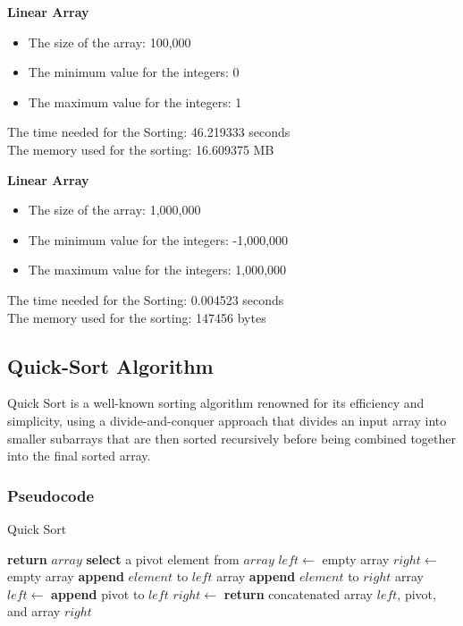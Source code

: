 \documentclass{article}
\begin{document}
\textbf{Linear Array}

\begin{itemize}
    \item The size of the array: 100,000
    \item The minimum value for the integers: 0
    \item The maximum value for the integers: 1
\end{itemize}

The time needed for the Sorting: 46.219333 seconds\\
The memory used for the sorting: 16.609375 MB

\textbf{Linear Array}

\begin{itemize}
    \item The size of the array: 1,000,000
    \item The minimum value for the integers: -1,000,000
    \item The maximum value for the integers: 1,000,000
\end{itemize}

The time needed for the Sorting: 0.004523 seconds\\
The memory used for the sorting: 147456 bytes

\restoregeometry

\subsection{Quick-Sort Algorithm}

Quick Sort is a well-known sorting algorithm renowned for its efficiency and simplicity, using a divide-and-conquer approach that divides an input array into smaller subarrays that are then sorted recursively before being combined together into the final sorted array.

\subsubsection{Pseudocode}

\begin{algorithm}[H]
\caption{Quick Sort}
\begin{algorithmic}[1]
        \State \textbf{return} $array$
    \Else
        \State \textbf{select} a pivot element from $array$ 
        \State $left \gets$ empty array
        \State $right \gets$ empty array
                \State \textbf{append} $element$ to $left$ array
            \Else
                \State \textbf{append} $element$ to $right$ array
            \EndIf
        \EndFor
        \State $left \gets$ 
        \State \textbf{append} pivot to $left$
        \State $right \gets$ 
        \State \textbf{return} concatenated array $left$, pivot, and array $right$
    \EndIf
\EndFunction
\end{algorithmic}
\end{algorithm}
\end{document}
